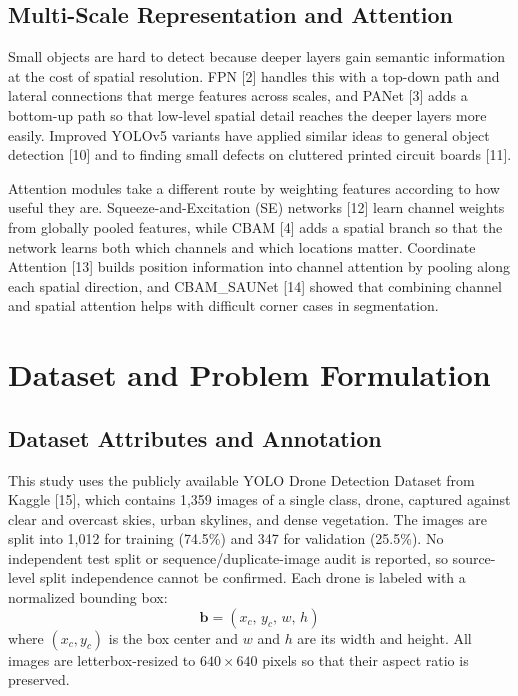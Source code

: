 \documentclass[conference]{IEEEtran}
\begin{document}
\subsection{Multi-Scale Representation and Attention}

Small objects are hard to detect because deeper layers gain semantic information at the cost of spatial resolution. FPN [2] handles this with a top-down path and lateral connections that merge features across scales, and PANet [3] adds a bottom-up path so that low-level spatial detail reaches the deeper layers more easily. Improved YOLOv5 variants have applied similar ideas to general object detection [10] and to finding small defects on cluttered printed circuit boards [11].

Attention modules take a different route by weighting features according to how useful they are. Squeeze-and-Excitation (SE) networks [12] learn channel weights from globally pooled features, while CBAM [4] adds a spatial branch so that the network learns both which channels and which locations matter. Coordinate Attention [13] builds position information into channel attention by pooling along each spatial direction, and CBAM\_SAUNet [14] showed that combining channel and spatial attention helps with difficult corner cases in segmentation.

\section{Dataset and Problem Formulation}

\subsection{Dataset Attributes and Annotation}

This study uses the publicly available YOLO Drone Detection Dataset from Kaggle [15], which contains 1,359 images of a single class, drone, captured against clear and overcast skies, urban skylines, and dense vegetation. The images are split into 1,012 for training (74.5\%) and 347 for validation (25.5\%). No independent test split or sequence/duplicate-image audit is reported, so source-level split independence cannot be confirmed. Each drone is labeled with a normalized bounding box:
\begin{equation}
\mathbf{b} = (x_c,\, y_c,\, w,\, h)
\end{equation}
where $(x_c, y_c)$ is the box center and $w$ and $h$ are its width and height. All images are letterbox-resized to $640\times640$ pixels so that their aspect ratio is preserved.
\end{document}
